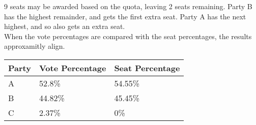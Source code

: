 \documentclass{article}
\begin{document}
    9 seats may be awarded based on the quota, leaving 2 seats remaining. Party B has the highest remainder, and gets the first extra seat. Party A has the next highest, and so also gets an extra seat. \\

    When the vote percentages are compared with the seat percentages, the results approxamitly align.
    \begin{center}
    \begin{tabular}{ |l|l|l| }
        \hline
        Party & Vote Percentage & Seat Percentage \\
        \hline
        A & 52.8\% & 54.55\% \\
        \hline
        B & 44.82\% & 45.45\% \\
        \hline
        C & 2.37\% & 0\% \\
        \hline
    \end{tabular}
    \end{center}
\end{document}
